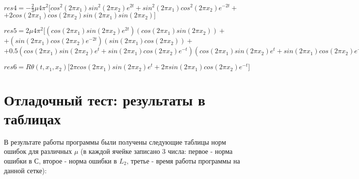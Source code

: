 \documentclass[a4paper]{article}
\theoremstyle{definition}
\numberwithin{equation}{section}
\begin{document}
\begin{enumerate}
$res4 = -\frac{2}{3}\mu 4\pi^2\big[ cos^2(2\pi x_1)sin^2(2\pi x_2)e^{2t} + sin^2(2\pi x_1)cos^2(2\pi x_2)e^{-2t} +$\\$+ 2cos(2\pi x_1)cos(2\pi x_2)sin(2\pi x_1)sin(2\pi x_2) \big]$

$res5 = 2\mu 4\pi^2\big[ (cos(2\pi x_1)sin(2\pi x_2)e^{2t})( cos(2\pi x_1)sin(2\pi x_2)) + $\\
$+ (sin(2\pi x_1)cos(2\pi x_2)e^{-2t})( sin(2\pi x_1)cos(2\pi x_2)) +$\\
$+ 0.5( cos(2\pi x_1)sin(2\pi x_2)e^t+ sin(2\pi x_1)cos(2\pi x_2)e^{-t})( cos(2\pi x_1)sin(2\pi x_2)e^t+ sin(2\pi x_1)cos(2\pi x_2)e^{-t}) \big]$

$res6 = R\theta(t,x_1,x_2)\big[ 2\pi cos(2\pi x_1)sin(2\pi x_2)e^t + 2\pi sin(2\pi x_1)cos(2\pi x_2)e^{-t} \big]$
\end{enumerate}
\newpage

\section{Отладочный тест: результаты в таблицах}
В результате работы программы были получены следующие таблицы норм ошибок для различных $\mu$ (в каждой ячейке записано 3 числа: первое - норма ошибки в С, второе - норма ошибки в $L_2$, третье - время работы программы на данной сетке):
\end{document}
